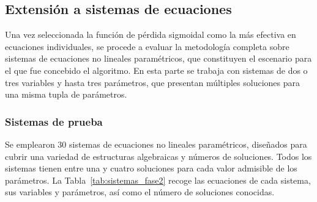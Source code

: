 \documentclass[12pt,a4paper]{article} \usepackage[utf8]{inputenc} \usepackage[spanish]{babel} \usepackage{amsmath, amssymb, amsthm} \usepackage{bm} \usepackage{float} \usepackage{longtable} \usepackage[hidelinks]{hyperref}
\begin{document}
\subsection{Extensión a sistemas de ecuaciones}
\label{sec:fase2}

Una vez seleccionada la función de pérdida sigmoidal como la más efectiva en ecuaciones individuales, se procede a evaluar la metodología completa sobre sistemas de ecuaciones no lineales paramétricos, que constituyen el escenario para el que fue concebido el algoritmo. En esta parte se trabaja con sistemas de dos o tres variables y hasta tres parámetros, que presentan múltiples soluciones para una misma tupla de parámetros.

\subsubsection{Sistemas de prueba}

Se emplearon 30 sistemas de ecuaciones no lineales paramétricos, diseñados para cubrir una variedad de estructuras algebraicas y números de soluciones. Todos los sistemas tienen entre una y cuatro soluciones para cada valor admisible de los parámetros. La Tabla~\ref{tab:sistemas_fase2} recoge las ecuaciones de cada sistema, sus variables y parámetros, así como el número de soluciones conocidas.
\end{document}

